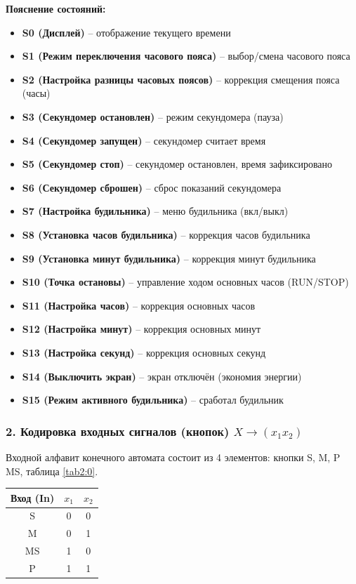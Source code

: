 \documentclass[11pt,a4paper,final]{article}
\begin{document}
	\textbf{Пояснение состояний:}
	\begin{itemize}
		\item \textbf{S0 (Дисплей)} -- отображение текущего времени
		\item \textbf{S1 (Режим переключения часового пояса)} -- выбор/смена часового пояса
		\item \textbf{S2 (Настройка разницы часовых поясов)} -- коррекция смещения пояса (часы)
		\item \textbf{S3 (Секундомер остановлен)} -- режим секундомера (пауза)
		\item \textbf{S4 (Секундомер запущен)} -- секундомер считает время
		\item \textbf{S5 (Секундомер стоп)} -- секундомер остановлен, время зафиксировано
		\item \textbf{S6 (Секундомер сброшен)} -- сброс показаний секундомера
		\item \textbf{S7 (Настройка будильника)} -- меню будильника (вкл/выкл)
		\item \textbf{S8 (Установка часов будильника)} -- коррекция часов будильника
		\item \textbf{S9 (Установка минут будильника)} -- коррекция минут будильника
		\item \textbf{S10 (Точка остановы)} -- управление ходом основных часов (RUN/STOP)
		\item \textbf{S11 (Настройка часов)} -- коррекция основных часов
		\item \textbf{S12 (Настройка минут)} -- коррекция основных минут
		\item \textbf{S13 (Настройка секунд)} -- коррекция основных секунд
		\item \textbf{S14 (Выключить экран)} -- экран отключён (экономия энергии)
		\item \textbf{S15 (Режим активного будильника)} -- сработал будильник
	\end{itemize}
	
	\subsubsection*{2. Кодировка входных сигналов (кнопок) \( X \rightarrow (x_1 x_2) \)}
	
	Входной алфавит конечного автомата состоит из 4 элементов: кнопки S, M, P MS, таблица \ref{tab2:0}.
	
	\begin{center}
		\label{tab2:0}
		\begin{tabular}{|c|c|c|}
			\hline
			Вход (In) & \( x_1 \) & \( x_2 \) \\
			\hline
			S & 0 & 0 \\
			M & 0 & 1 \\
			MS & 1 & 0 \\
			P & 1 & 1 \\
			\hline
		\end{tabular}
	\end{center}
	
\end{document}
